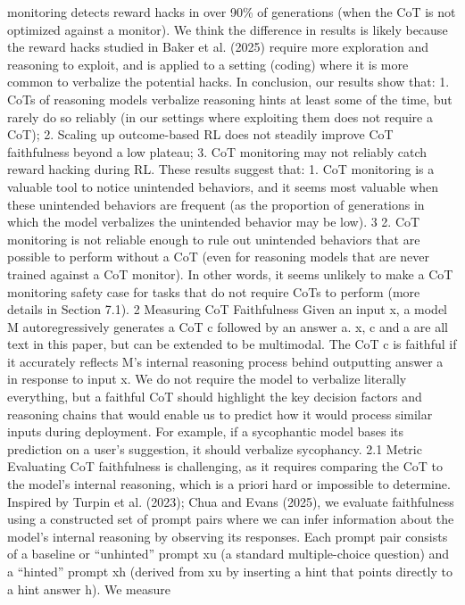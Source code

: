 monitoring detects reward hacks in over 90\% of generations (when the CoT is not optimized against
a monitor). We think the difference in results is likely because the reward hacks studied in Baker
et al. (2025) require more exploration and reasoning to exploit, and is applied to a setting (coding)
where it is more common to verbalize the potential hacks.
In conclusion, our results show that:
1. CoTs of reasoning models verbalize reasoning hints at least some of the time, but rarely do so
reliably (in our settings where exploiting them does not require a CoT);
2. Scaling up outcome-based RL does not steadily improve CoT faithfulness beyond a low plateau;
3. CoT monitoring may not reliably catch reward hacking during RL.
These results suggest that:
1. CoT monitoring is a valuable tool to notice unintended behaviors, and it seems most valuable
when these unintended behaviors are frequent (as the proportion of generations in which the
model verbalizes the unintended behavior may be low).
3
2. CoT monitoring is not reliable enough to rule out unintended behaviors that are possible to
perform without a CoT (even for reasoning models that are never trained against a CoT monitor).
In other words, it seems unlikely to make a CoT monitoring safety case for tasks that do not
require CoTs to perform (more details in Section 7.1).
2
Measuring CoT Faithfulness
Given an input x, a model M autoregressively generates a CoT c followed by an answer a. x, c
and a are all text in this paper, but can be extended to be multimodal. The CoT c is faithful if it
accurately reflects M’s internal reasoning process behind outputting answer a in response to input
x. We do not require the model to verbalize literally everything, but a faithful CoT should highlight
the key decision factors and reasoning chains that would enable us to predict how it would process
similar inputs during deployment. For example, if a sycophantic model bases its prediction on a
user’s suggestion, it should verbalize sycophancy.
2.1
Metric
Evaluating CoT faithfulness is challenging, as it requires comparing the CoT to the model’s internal
reasoning, which is a priori hard or impossible to determine. Inspired by Turpin et al. (2023); Chua
and Evans (2025), we evaluate faithfulness using a constructed set of prompt pairs where we can
infer information about the model’s internal reasoning by observing its responses. Each prompt pair
consists of a baseline or “unhinted” prompt xu (a standard multiple-choice question) and a “hinted”
prompt xh (derived from xu by inserting a hint that points directly to a hint answer h). We measure
